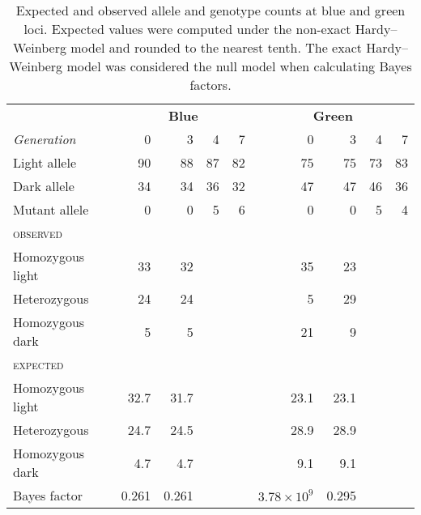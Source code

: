 \documentclass{article}
\begin{document}
    \begin{table}
        \centering
        \caption{Expected and observed allele and genotype counts at blue and
                     green loci.
                 Expected values were computed under the non-exact
                     Hardy--Weinberg model and rounded to the nearest tenth.
                 The exact Hardy--Weinberg model was considered the null model
                     when calculating Bayes factors.}
        \label{tab:data}
        \begin{tabular}{l r r r r r r r r}
            \toprule
            & \multicolumn{4}{c}{\textbf{Blue}}
                & \multicolumn{4}{c}{\textbf{Green}} \\
            \emph{Generation} & 0 & 3 & 4 & 7 & 0 & 3 & 4 & 7 \\
            \midrule
            Light allele & 90 & 88 & 87 & 82 & 75 & 75 & 73 & 83 \\
            Dark allele & 34 & 34 & 36 & 32 & 47 & 47 & 46 & 36 \\
            Mutant allele & 0 & 0 & 5 & 6 & 0 & 0 & 5 & 4 \\
            \midrule
            \textsc{observed} \\
            Homozygous light & 33 & 32 & & & 35 & 23 \\
            Heterozygous & 24 & 24 & & & 5 & 29 \\
            Homozygous dark & 5 & 5 & & & 21 & 9 \\
            \midrule
            \textsc{expected} \\
            Homozygous light & 32.7 & 31.7 & & & 23.1 & 23.1 \\
            Heterozygous & 24.7 & 24.5 & & & 28.9 & 28.9 \\
            Homozygous dark & 4.7 & 4.7 & & & 9.1 & 9.1 \\
            \midrule
            Bayes factor & 0.261 & 0.261 & & & $3.78 \times 10^9$ & 0.295 \\
            \bottomrule
        \end{tabular}
    \end{table}
\end{document}

